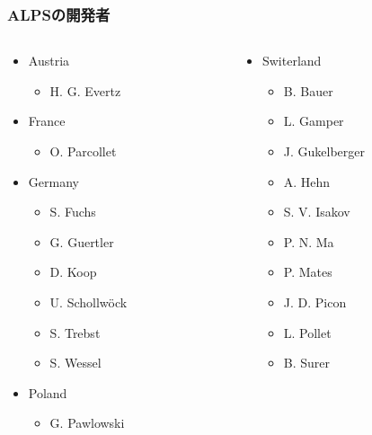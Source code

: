 \begin{frame}
  \frametitle{ALPSの開発者}
  \begin{columns}[T]
    \begin{column}{.34\textwidth}
      \begin{itemize}
      \item Austria
        \begin{itemize}
        \item H. G. Evertz
        \end{itemize}
      \item France
        \begin{itemize}
        \item O. Parcollet
        \end{itemize}
      \item Germany
        \begin{itemize}
        \item S. Fuchs
        \item G. Guertler
        \item D. Koop
        \item U. Schollw\"ock
        \item S. Trebst
        \item S. Wessel
        \end{itemize}
      \item Poland
        \begin{itemize}
        \item G. Pawlowski
        \end{itemize}
      \end{itemize}
    \end{column}
    \begin{column}{.34\textwidth}
      \begin{itemize}
      \item Switerland
        \begin{itemize}
        \item B. Bauer
        \item L. Gamper
        \item J. Gukelberger
        \item A. Hehn
        \item S. V. Isakov
        \item P. N. Ma
        \item P. Mates
        \item J. D. Picon
        \item L. Pollet
        \item B. Surer

\end{itemize}
\end{itemize}
\end{column}
\end{columns}
\end{frame}
